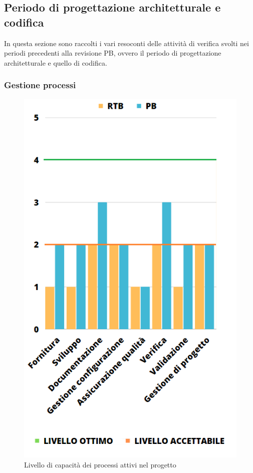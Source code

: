 \subsection{Periodo di progettazione architetturale e codifica}
In questa sezione sono raccolti i vari resoconti delle attività di verifica svolti nei periodi precedenti alla revisione PB, ovvero il periodo di progettazione architetturale e quello di codifica.
\subsubsection{Gestione processi}
\begin{figure}[H]
	\centering
	\includegraphics[scale=1.1]{img/SPICE2.png}
	\caption{Livello di capacità dei processi attivi nel progetto}
\end{figure}

